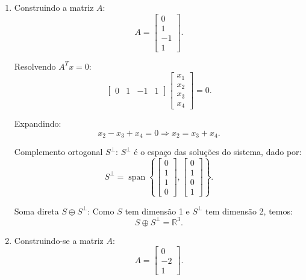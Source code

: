\begin{resolution}
\begin{enumerate}[label=\alph*)]
    \item  Construindo a matriz \( A \):
          \[
            A = \begin{bmatrix}
              0  \\
              1  \\
              -1 \\
              1
            \end{bmatrix}.
          \]

          Resolvendo \( A^T x = 0 \):
          \[
            \begin{bmatrix}
              0 & 1 & -1 & 1
            \end{bmatrix}
            \begin{bmatrix}
              x_1 \\
              x_2 \\
              x_3 \\
              x_4
            \end{bmatrix}
            = 0.
          \]

          Expandindo:
          \[
            x_2 - x_3 + x_4 = 0 \Rightarrow x_2 = x_3 + x_4.
          \]

          Complemento ortogonal \( S^\perp \):
          \( S^\perp \) é o espaço das soluções do sistema, dado por:
          \[
            S^\perp = \operatorname{span}\left\{
            \begin{bmatrix}
              0 \\ 1 \\ 1 \\ 0
            \end{bmatrix},
            \begin{bmatrix}
              0 \\ 1 \\ 0 \\ 1
            \end{bmatrix}
            \right\}.
          \]

          Soma direta \( S \oplus S^\perp \):
          Como \( S \) tem dimensão 1 e \( S^\perp \) tem dimensão 2, temos:
          \[
            S \oplus S^\perp = \mathbb{R}^3.
          \]

    \item Construindo-se a matriz \( A \):
          \[
            A = \begin{bmatrix}
              0  \\
              -2 \\
              1
            \end{bmatrix}.
          \]


\end{enumerate}
\end{resolution}
